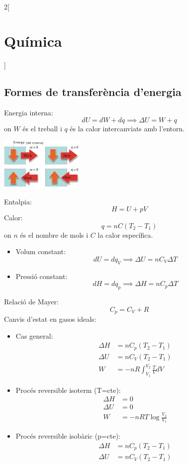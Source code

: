 \documentclass[../../../main.tex]{subfiles}
\begin{document}
\begin{multicols}{2}[\section{Química}]
\subsection{Formes de transferència d'energia}
Energia interna: 
$$dU=dW+dq\implies\Delta U=W+q$$ {\footnotesize on $W$ és el treball i $q$ és la calor intercanviats amb l'entorn.}\newline
\begin{minipage}{\linewidth} 
    \centering
    \includegraphics[width=4cm]{Physics/1st/Chemistry/Images/workheat.jpg} 
    \label{fig:my_label}
\end{minipage}
Entalpia: $$H=U+pV$$
Calor: $$q=nC(T_2-T_1)$$ {\footnotesize on $n$ és el nombre de mols i $C$ la calor específica.}
\begin{itemize}
    \item Volum constant: $$dU=dq_V\implies\Delta U=nC_V\Delta T$$
    \item Pressió constant: $$dH=dq_p\implies\Delta H=nC_p\Delta T$$
\end{itemize}
Relació de Mayer: $$C_p=C_V+R$$
Canvis d'estat en gasos ideals:
\begin{itemize}
    \item Cas general:
    \begin{align*}
        \Delta H&=nC_p(T_2-T_1)\\
        \Delta U&=nC_V(T_2-T_1)\\
        W&=-nR\int_{V_1}^{V_2}\frac{T}{V}dV
    \end{align*}
    \item Procés reversible isoterm (T=cte):
    \begin{align*}
        \Delta H&=0\\
        \Delta U&=0\\
        W&=-nRT\log\frac{V_2}{V_1}
    \end{align*}
    \item Procés reversible isobàric (p=cte):
    \begin{align*}
        \Delta H&=nC_p(T_2-T_1)\\
        \Delta U&=nC_V(T_2-T_1)\\

\end{align*}
\end{itemize}
\end{multicols}
\end{document}
